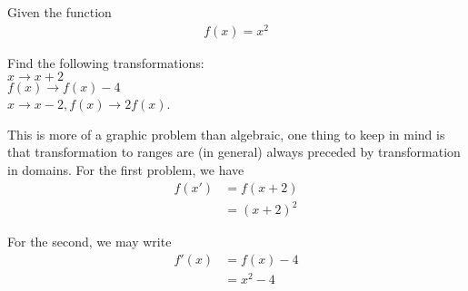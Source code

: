\documentclass[a4paper]{article}
\begin{document}
\begin{question}{}{}
Given the function
\begin{align*}
f(x) = x^2
\end{align*}


\begin{center}
\end{center}



Find the following transformations: \\ \(x \to x+2\)\\ \(f(x) \to f(x)-4\)\\ \(x \to x-2, f(x) \to 2f(x)\).
\end{question}
This is more of a graphic problem than algebraic, one thing to keep in mind is that transformation to ranges are (in general) always preceded by transformation in domains. For the first problem, we have
\begin{align*}
f(x') &= f(x+2) \\
    &=(x+2)^2
\end{align*}

\begin{center}
\end{center}


For the second, we may write
\begin{align*}
f'(x) &= f(x) - 4 \\
    &= x^2 -4
\end{align*}

\begin{center}
\end{center}
\end{document}
